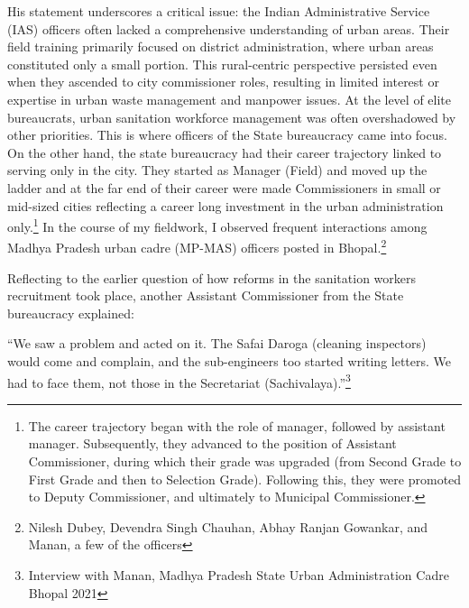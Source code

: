 His statement underscores a critical issue: the Indian Administrative Service (IAS) officers often lacked a comprehensive understanding of urban areas. Their field training primarily focused on district administration, where urban areas constituted only a small portion. This rural-centric perspective persisted even when they ascended to city commissioner roles, resulting in limited interest or expertise in urban waste management and manpower issues. At the level of elite bureaucrats, urban sanitation workforce management was often overshadowed by other priorities. This is where officers of the State bureaucracy came into focus. On the other hand, the state bureaucracy had their career trajectory linked to serving only in the city. They started as Manager (Field) and moved up the ladder and at the far end of their career were made Commissioners in small or mid-sized cities reflecting a career long investment in the urban administration only.\footnote{The career trajectory began with the role of manager, followed by assistant manager. Subsequently, they advanced to the position of Assistant Commissioner, during which their grade was upgraded (from Second Grade to First Grade and then to Selection Grade). Following this, they were promoted to Deputy Commissioner, and ultimately to Municipal Commissioner.} In the course of my fieldwork, I observed frequent interactions among Madhya Pradesh urban cadre (MP-MAS) officers posted in Bhopal.\footnote{Nilesh Dubey, Devendra Singh Chauhan, Abhay Ranjan Gowankar, and Manan, a few of the officers}

Reflecting to the earlier question of how reforms in the sanitation workers recruitment took place, another Assistant Commissioner from the State bureaucracy explained:

``We saw a problem and acted on it. The Safai Daroga (cleaning inspectors) would come and complain, and the sub-engineers too started writing letters. We had to face them, not those in the Secretariat (Sachivalaya).''\footnote{Interview with Manan, Madhya Pradesh State Urban Administration Cadre Bhopal 2021}

